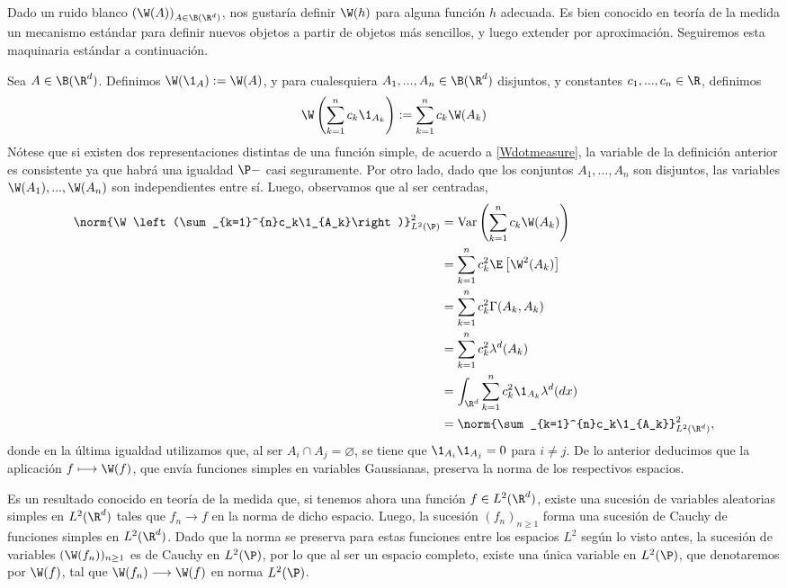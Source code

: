 \begin{ejem} 
Dado un ruido blanco $\left(\W(A)\right)_{A\in \B(\R^d)}$, nos gustaría definir $\W(h)$ para alguna función $h$ adecuada. Es bien conocido en teoría de la medida un mecanismo estándar para definir nuevos objetos a partir de objetos más sencillos, y luego extender por aproximación. Seguiremos esta maquinaria estándar a continuación.

Sea $A\in \B(\R^d)$. Definimos $\W(\1_A):=\W(A)$, y para cualesquiera $A_1,...,A_n\in \B(\R^{d})$ disjuntos, y constantes $c_1,...,c_n\in \R$,  definimos
\[
\W \left(\sum_{k=1}^{n}c_k\1_{A_k}\right):=\sum_{k=1}^{n}c_k\W(A_k)    
\]
Nótese que si existen dos representaciones distintas de una función simple, de acuerdo a \eqref{Wdotmeasure}, la variable de la definición anterior es consistente ya que habrá una igualdad $\P-$ casi seguramente. Por otro lado, dado que los conjuntos $A_1,...,A_n$ son disjuntos, las variables $\W(A_1),...,\W(A_n)$ son independientes entre sí. Luego, observamos que al ser centradas,
\begin{align*}
    \norm{\W \left(\sum_{k=1}^{n}c_k\1_{A_k}\right)}_{L^{2}(\P)}^2&=\text{Var}\left(\sum_{k=1}^{n}c_k\W(A_k)\right)\\
    &=\sum_{k=1}^{n}c_k^2 \E\left[\W^2(A_k)\right]\\
    &=\sum_{k=1}^{n}c_k^2 \Gamma(A_k,A_k)\\
    &=\sum_{k=1}^{n}c_k^2\lambda^{d}(A_k)\\
    &=\int_{\R^d}\sum_{k=1}^{n}c_k^2\1_{A_k}\lambda^d(dx)\\
    &=\norm{\sum_{k=1}^{n}c_k\1_{A_k}}^2_{L^{2}(\R^{d})},
\end{align*}
donde en la última igualdad utilizamos que, al ser $A_i\cap A_j=\varnothing$, se tiene que $\1_{A_i}\1_{A_j}=0$ para $i\neq j$. De lo anterior deducimos que la aplicación $f\longmapsto \W(f)$, que envía funciones simples en variables Gaussianas, preserva la norma de los respectivos espacios.

Es un resultado conocido en teoría de la medida que, si tenemos ahora una función $f\in L^{2}(\R^{d})$, existe una sucesión de variables aleatorias simples en $L^{2}(\R^d)$ tales que $f_n\to f$ en la norma de dicho espacio. Luego, la sucesión $(f_n)_{n\ge 1}$ forma una sucesión de Cauchy de funciones simples en $L^2(\R^{d})$. Dado que la norma se preserva para estas funciones entre los espacios $L^2$ según lo visto antes, la sucesión de variables $(\W(f_n))_{n\ge 1}$ es de Cauchy en $L^{2}(\P)$, por lo que al ser un espacio completo, existe una única variable en $L^{2}(\P)$, que denotaremos por $\W(f)$, tal que $\W(f_n)\longrightarrow \W(f)$ en norma $L^{2}(\P)$.


\end{ejem}
